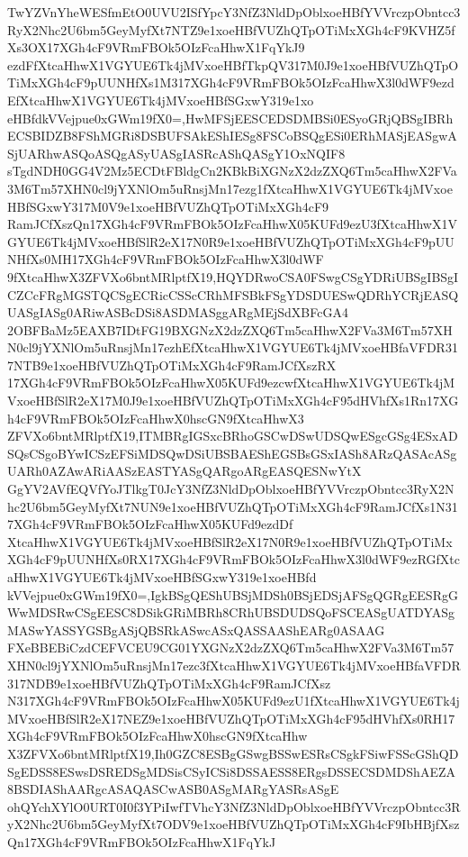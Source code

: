 \documentclass[multi=frame]{standalone}
\begin{document}
\begin{world}
        TwYZVnYheWESfmEtO0UVU2ISfYpcY3NfZ3NldDpOblxoeHBfYVVrczpObntcc3RyX2Nhc2U6bm5GeyMyfXt7NTZ9e1xoeHBfVUZhQTpOTiMxXGh4cF9KVHZ5fXs3OX17XGh4cF9VRmFBOk5OIzFcaHhwX1FqYkJ9
        ezdFfXtcaHhwX1VGYUE6Tk4jMVxoeHBfTkpQV317M0J9e1xoeHBfVUZhQTpOTiMxXGh4cF9pUUNHfXs1M317XGh4cF9VRmFBOk5OIzFcaHhwX3l0dWF9ezdEfXtcaHhwX1VGYUE6Tk4jMVxoeHBfSGxwY319e1xo
        eHBfdkVVejpue0xGWm19fX0=,HwMFSjEESCEDSDMBSi0ESyoGRjQBSgIBRhECSBIDZB8FShMGRi8DSBUFSAkEShIESg8FSCoBSQgESi0ERhMASjEASgwASjUARhwASQoASQgASyUASgIASRcAShQASgY1OxNQIF8
        sTgdNDH0GG4V2Mz5ECDtFBldgCn2KBkBiXGNzX2dzZXQ6Tm5caHhwX2FVa3M6Tm57XHN0cl9jYXNlOm5uRnsjMn17ezg1fXtcaHhwX1VGYUE6Tk4jMVxoeHBfSGxwY317M0V9e1xoeHBfVUZhQTpOTiMxXGh4cF9
        RamJCfXszQn17XGh4cF9VRmFBOk5OIzFcaHhwX05KUFd9ezU3fXtcaHhwX1VGYUE6Tk4jMVxoeHBfSlR2eX17N0R9e1xoeHBfVUZhQTpOTiMxXGh4cF9pUUNHfXs0MH17XGh4cF9VRmFBOk5OIzFcaHhwX3l0dWF
        9fXtcaHhwX3ZFVXo6bntMRlptfX19,HQYDRwoCSA0FSwgCSgYDRiUBSgIBSgICZCcFRgMGSTQCSgECRicCSScCRhMFSBkFSgYDSDUESwQDRhYCRjEASQUASgIASg0ARiwASBcDSi8ASDMASggARgMEjSdXBFcGA4
        2OBFBaMz5EAXB7IDtFG19BXGNzX2dzZXQ6Tm5caHhwX2FVa3M6Tm57XHN0cl9jYXNlOm5uRnsjMn17ezhEfXtcaHhwX1VGYUE6Tk4jMVxoeHBfaVFDR317NTB9e1xoeHBfVUZhQTpOTiMxXGh4cF9RamJCfXszRX
        17XGh4cF9VRmFBOk5OIzFcaHhwX05KUFd9ezcwfXtcaHhwX1VGYUE6Tk4jMVxoeHBfSlR2eX17M0J9e1xoeHBfVUZhQTpOTiMxXGh4cF95dHVhfXs1Rn17XGh4cF9VRmFBOk5OIzFcaHhwX0hscGN9fXtcaHhwX3
        ZFVXo6bntMRlptfX19,ITMBRgIGSxcBRhoGSCwDSwUDSQwESgcGSg4ESxADSQsCSgoBYwICSzEFSiMDSQwDSiUBSBAEShEGSBsGSxIASh8ARzQASAcASgUARh0AZAwARiAASzEASTYASgQARgoARgEASQESNwYtX
        GgYV2AVfEQVfYoJTlkgT0JcY3NfZ3NldDpOblxoeHBfYVVrczpObntcc3RyX2Nhc2U6bm5GeyMyfXt7NUN9e1xoeHBfVUZhQTpOTiMxXGh4cF9RamJCfXs1N317XGh4cF9VRmFBOk5OIzFcaHhwX05KUFd9ezdDf
        XtcaHhwX1VGYUE6Tk4jMVxoeHBfSlR2eX17N0R9e1xoeHBfVUZhQTpOTiMxXGh4cF9pUUNHfXs0RX17XGh4cF9VRmFBOk5OIzFcaHhwX3l0dWF9ezRGfXtcaHhwX1VGYUE6Tk4jMVxoeHBfSGxwY319e1xoeHBfd
        kVVejpue0xGWm19fX0=,IgkBSgQEShUBSjMDSh0BSjEDSjAFSgQGRgEESRgGWwMDSRwCSgEESC8DSikGRiMBRh8CRhUBSDUDSQoFSCEASgUATDYASgMASwYASSYGSBgASjQBSRkASwcASxQASSAAShEARg0ASAAG
        FXeBBEBiCzdCEFVCEU9CG01YXGNzX2dzZXQ6Tm5caHhwX2FVa3M6Tm57XHN0cl9jYXNlOm5uRnsjMn17ezc3fXtcaHhwX1VGYUE6Tk4jMVxoeHBfaVFDR317NDB9e1xoeHBfVUZhQTpOTiMxXGh4cF9RamJCfXsz
        N317XGh4cF9VRmFBOk5OIzFcaHhwX05KUFd9ezU1fXtcaHhwX1VGYUE6Tk4jMVxoeHBfSlR2eX17NEZ9e1xoeHBfVUZhQTpOTiMxXGh4cF95dHVhfXs0RH17XGh4cF9VRmFBOk5OIzFcaHhwX0hscGN9fXtcaHhw
        X3ZFVXo6bntMRlptfX19,Ih0GZC8ESBgGSwgBSSwESRsCSgkFSiwFSScGShQDSgEDSS8ESwsDSREDSgMDSisCSyICSi8DSSAESS8ERgsDSSECSDMDShAEZA8BSDIAShAARgcASAQASCwASB0ASgMARgYASRsASgE
        ohQYchXYlO0URT0I0f3YPiIwfTVhcY3NfZ3NldDpOblxoeHBfYVVrczpObntcc3RyX2Nhc2U6bm5GeyMyfXt7ODV9e1xoeHBfVUZhQTpOTiMxXGh4cF9IbHBjfXszQn17XGh4cF9VRmFBOk5OIzFcaHhwX1FqYkJ

\end{world}
\end{document}
